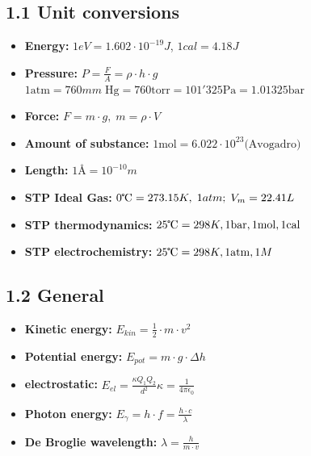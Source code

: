 \subsection{1.1 Unit conversions}
	\begin{itemize}
		\itemsep0em
		\raggedright
  		\item \textbf{Energy:} $1eV=1.602\cdot 10^{-19}J$,    $1cal=4.18J$
    	\item \textbf{Pressure:} $P = \frac{F}{A} = \rho \cdot h \cdot g$\\ $1 \textrm{atm} = 760mm \; \textrm{Hg} = 760 \textrm{torr} = 101'325 \textrm{Pa} = 1.01325 \textrm{bar}$ 
    	\item \textbf{Force:} $F = m \cdot g, \; m = \rho \cdot V$
		\item \textbf{Amount of substance:} $1 \textrm{mol} = 6.022\cdot 10^{23} \textrm{(Avogadro)}$
    	\item \textbf{Length:} $1\text{Å}=10^{-10}m$
    	\item \textbf{STP Ideal Gas:} $0\tccentigrade = 273.15K, \; 1atm; \; V_m = 22.41L$
    	\item \textbf{STP thermodynamics: } $25\tccentigrade=298K, 1\textrm{bar}, 1 \textrm{mol}, 1 \textrm{cal}$
    	\item \textbf{STP electrochemistry: } $25\tccentigrade=298K, 1 \textrm{atm}, 1 M$
	\end{itemize}

\subsection{1.2 General}
    \begin{itemize}
		\itemsep0em
        \item \textbf{Kinetic energy:} $E_{kin} = \frac{1}{2} \cdot m \cdot v^2$
        \item \textbf{Potential energy:} $E_{pot} = m \cdot g \cdot \Delta h$
        \item \textbf{electrostatic:} $E_{el}=\frac{\kappa Q_1Q_2}{d^2}$\quad $\kappa = \frac{1}{4\pi \epsilon_0}$
        \item \textbf{Photon energy: } $E_\gamma = h\cdot f = \frac{h\cdot c}{\lambda}$
        \item \textbf{De Broglie wavelength: } $\lambda = \frac{h}{m\cdot v}$
    \end{itemize}
    	
